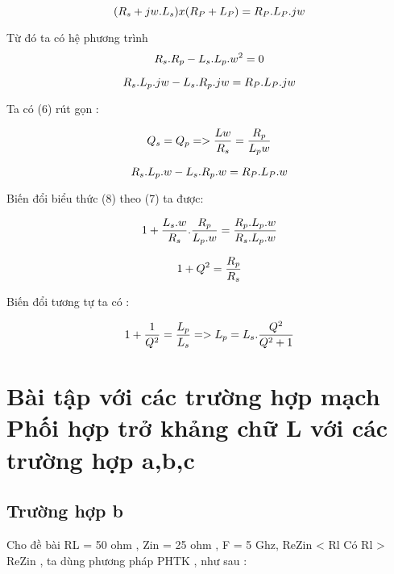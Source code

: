 \documentclass{article}
\begin{document}
\begin{equation}
\Large
       (R_{s} + jw.L_{s}) x (R_{P}+L_{P}) = R_{P}.L_{P}.jw 
\end{equation}

Từ đó ta có hệ phương trình 
\begin{equation}
\Large
    R_{s}.R_{p} - L_{s}.L_{p}.w^2 =0 
\end{equation}

\begin{equation}
\Large
    R_{s}.L_{p}.jw - L_{s}.R_{p}.jw =   R_{P}.L_{P}.jw
\end{equation}

Ta có (6) rút gọn :


\begin{equation}
\Large
    Q_{s} = Q_{p} => \frac{Lw}{R_{s}} = \frac{R_{p}}{L_{p}w}
\end{equation}

\begin{equation}
\Large
    R_{s}.L_{p}.w - L_{s}.R_{p}.w =   R_{P}.L_{P}.w
\end{equation}


Biến đổi biểu thức (8) theo (7) ta được:

\begin{equation}
\Large
1+ \frac{L_{s}.w}{R_{s}} . \frac{R_{p}}{L_{p}.w}  = \frac{R_{p}. L_{p}.w}{R_{s}.L_{p}.w} 
\end{equation}

\begin{equation}
\Large
1+ Q^2 = \frac{R_{p}}{R_{s}} 
\end{equation}

Biến đổi tương tự ta có :


\begin{equation}
\Large
1+ \frac{1}{Q^2} = \frac{L_{p}}{L_{s}} => L_{p} = L_{s} . \frac{Q^2}{Q^2+1}
\end{equation}






\section{Bài tập với các trường hợp mạch Phối hợp trở khảng chữ L với các trường hợp a,b,c}

\subsection{Trường hợp b}
Cho đề bài RL = 50 ohm , Zin = 25 ohm , F = 5 Ghz, Re{Zin} < Rl 
Có Rl > Re{Zin} , ta dùng phương pháp PHTK , như sau :
\end{document}
